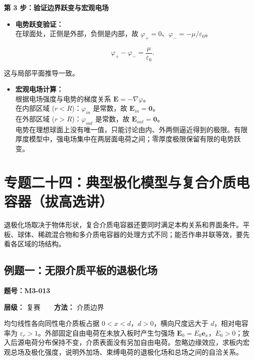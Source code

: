 \textbf{第 3 步：验证边界跃变与宏观电场}

\begin{itemize}
\item
  \textbf{电势跃变验证：}\\
  在球面处，正侧是外部，负侧是内部，故
  \(\varphi_+=0\)、\(\varphi_-=-\mu/\varepsilon_0\)。

  \[
  \varphi_+-\varphi_-=\frac{\mu}{\varepsilon_0}.
  \]
\end{itemize}

这与局部平面推导一致。

\begin{itemize}
\tightlist
\item
  \textbf{宏观电场计算：}\\
  根据电场强度与电势的梯度关系 \(\mathbf{E} = -\nabla \varphi\)。\\
  在内部区域 (\(r < R\))：\(\varphi_{in}\) 是常数，故
  \(\mathbf{E}_{in} = \mathbf{0}\)。\\
  在外部区域 (\(r > R\))：\(\varphi_{out}\) 是常数，故
  \(\mathbf{E}_{out} = \mathbf{0}\)。\\
  电势在理想球面上没有唯一值，只能讨论由内、外两侧逼近得到的极限。有限厚度模型中，强电场集中在两层面电荷之间；零厚度极限保留有限的电势跃变。
\end{itemize}

\section{专题二十四：典型极化模型与复合介质电容器（拔高选讲）}\label{m3:ux4e13ux9898ux4e8cux5341ux56dbux5178ux578bux6781ux5316ux6a21ux578bux4e0eux590dux5408ux4ecbux8d28ux7535ux5bb9ux5668ux62d4ux9ad8ux9009ux8bb2}

退极化场取决于物体形状，复合介质电容器还要同时满足本构关系和界面条件。平板、球体、稀疏混合物和多介质电容器的处理方式不同；能否作串并联等效，要先看各区域的场结构。

\subsection{例题一：无限介质平板的退极化场}\label{m3:ux4f8bux9898ux4e00ux65e0ux9650ux4ecbux8d28ux5e73ux677fux7684ux9000ux6781ux5316ux573a}

\textbf{题号：M3-013}

\textbf{层级：} 复赛　　\textbf{方法：} 介质边界

均匀线性各向同性电介质板占据 \(0<x<d\)，\(d>0\)，横向尺度远大于
\(d\)，相对电容率为
\(\varepsilon_r>1\)。外部固定自由电荷在未放入板时产生匀强场
\(\mathbf E_0=E_0\mathbf e_x\)，\(E_0>0\)；放入后源电荷分布保持不变，介质表面没有另加自由电荷。忽略边缘效应，求板内宏观总场及极化强度，说明外加场、束缚电荷的退极化场和总场之间的自洽关系。

